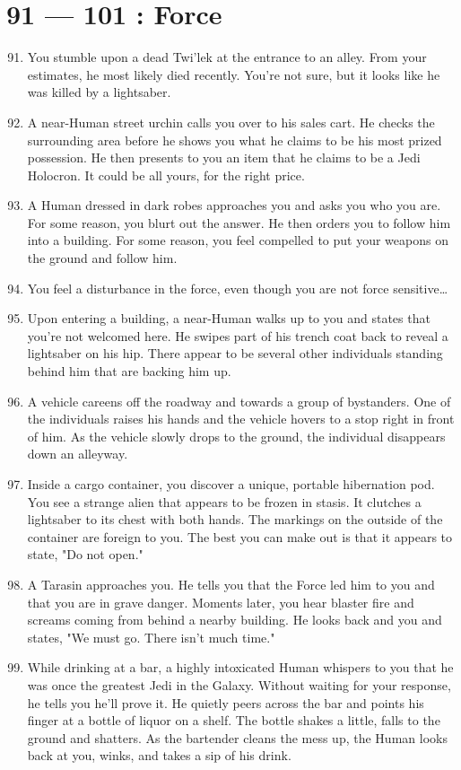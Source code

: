 \documentclass{article}
\begin{document}
\section*{91 --- 101 : Force}
\begin{enumerate}
	\setcounter{enumi}{90}
	\item You stumble upon a dead Twi’lek at the entrance to an alley. From your estimates, he most likely died recently. You’re not sure, but it looks like he was killed by a lightsaber.
	\item A near-Human street urchin calls you over to his sales cart. He checks the surrounding area before he shows you what he claims to be his most prized possession. He then presents to you an item that he claims to be a Jedi Holocron. It could be all yours, for the right price.
	\item A Human dressed in dark robes approaches you and asks you who you are. For some reason, you blurt out the answer. He then orders you to follow him into a building. For some reason, you feel compelled to put your weapons on the ground and follow him.
	\item You feel a disturbance in the force, even though you are not force sensitive…
	\item Upon entering a building, a near-Human walks up to you and states that you’re not welcomed here. He swipes part of his trench coat back to reveal a lightsaber on his hip. There appear to be several other individuals standing behind him that are backing him up.
	\item A vehicle careens off the roadway and towards a group of bystanders. One of the individuals raises his hands and the vehicle hovers to a stop right in front of him. As the vehicle slowly drops to the ground, the individual disappears down an alleyway.
	\item Inside a cargo container, you discover a unique, portable hibernation pod. You see a strange alien that appears to be frozen in stasis. It clutches a lightsaber to its chest with both hands. The markings on the outside of the container are foreign to you. The best you can make out is that it appears to state, "Do not open."
	\item A Tarasin approaches you. He tells you that the Force led him to you and that you are in grave danger. Moments later, you hear blaster fire and screams coming from behind a nearby building. He looks back and you and states, "We must go. There isn’t much time."
	\item While drinking at a bar, a highly intoxicated Human whispers to you that he was once the greatest Jedi in the Galaxy. Without waiting for your response, he tells you he’ll prove it. He quietly peers across the bar and points his finger at a bottle of liquor on a shelf. The bottle shakes a little, falls to the ground and shatters. As the bartender cleans the mess up, the Human looks back at you, winks, and takes a sip of his drink.

\end{enumerate}
\end{document}
